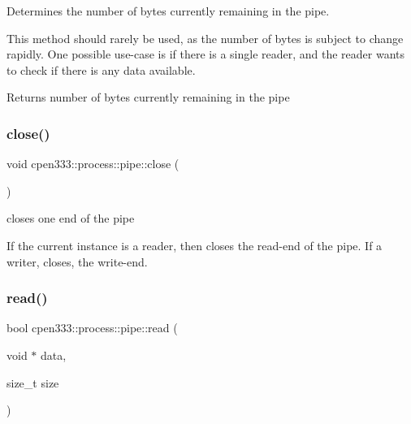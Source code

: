 Determines the number of bytes currently remaining in the pipe. 

This method should rarely be used, as the number of bytes is subject to change rapidly. One possible use-\/case is if there is a single reader, and the reader wants to check if there is any data available.

\begin{DoxyReturn}{Returns}
number of bytes currently remaining in the pipe 
\end{DoxyReturn}
\mbox{\label{classcpen333_1_1process_1_1pipe_abe03b5f5eacd1546db7a0ef6ffb3ba71}} 
\subsubsection{\texorpdfstring{close()}{close()}}
{\footnotesize\ttfamily void cpen333\+::process\+::pipe\+::close (\begin{DoxyParamCaption}{ }\end{DoxyParamCaption})\hspace{0.3cm}{\ttfamily [inline]}}



closes one end of the pipe 

If the current instance is a reader, then closes the read-\/end of the pipe. If a writer, closes, the write-\/end. \mbox{\label{classcpen333_1_1process_1_1pipe_ae25219bad758b0b54887addb2d6bd729}} 
\subsubsection{\texorpdfstring{read()}{read()}\hspace{0.1cm}{\footnotesize\ttfamily [1/3]}}
{\footnotesize\ttfamily bool cpen333\+::process\+::pipe\+::read (\begin{DoxyParamCaption}\item[{void $\ast$}]{data,  }\item[{size\+\_\+t}]{size }\end{DoxyParamCaption})\hspace{0.3cm}{\ttfamily [inline]}}



